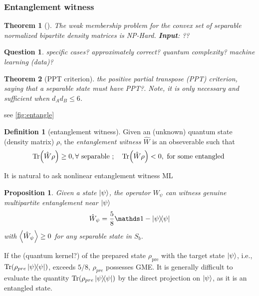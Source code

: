 \documentclass[
10pt,
aps,
pra,
linenumbers,
floatfix,
]{revtex4-2}
\theoremstyle{plain}
\newtheorem{theorem}{Theorem}
\newtheorem{proposition}{Proposition}
\newtheorem{question}{Question}
\theoremstyle{definition}
\newtheorem{definition}{Definition}
\newcommand{\ew}{\hat{W}}
\newcommand{\dm}{\rho}
\begin{document}
\subsubsection{Entanglement witness}\label{sec:entanglement_witness}
\begin{theorem}[\cite{gurvitsClassicalDeterministicComplexity2003}]
	The weak membership problem for the convex set of separable normalized bipartite density matrices is NP-Hard.
	\textbf{Input}: ??
\end{theorem}
\begin{question}
	specific cases? approximately correct? quantum complexity? machine learning (data)?
\end{question}

\begin{theorem}[PPT criterion]
	the positive partial transpose (PPT) criterion, saying that a separable state must have PPT?.
	Note, it is only necessary and sufficient when $d_A d_B \le 6$.
\end{theorem}
see \cref{fig:entangle}
\begin{definition}[entanglement witness]\label{def:entanglement_witness}
	Given an (unknown) quantum state (density matrix) $\dm$, the \emph{entanglement witness} $\ew$ is an obseverable such that
	\begin{equation}
		\Tr(\ew\dm) \ge 0 , \forall \text{ separable };\quad
		\Tr(\ew\dm) < 0 , \text{ for some entangled }
	\end{equation}
\end{definition}
It is natural to ask nonlinear entanglement witness \cite{guhneNonlinearEntanglementWitnesses2006}  
 ML
\begin{proposition}
	Given a state $\ket{\psi}$,
	the  operator $\ew_{\psi}$ can witness genuine multipartite entanglement near $\ket{\psi}$
	\begin{equation}
		\ew_{\psi} = \frac{5}{8}\identity - \op{\psi} 
	\end{equation}
	with $\expval{\ew_{\psi}}\ge 0$ for any separable state in $S_b$.
\end{proposition}
If the  (quantum kernel?) of the prepared state $\dm_{\text{pre}}$ with the target state $\ket{\psi}$, i.e., $\Tr(\dm_{pre}\op{\psi})$, exceeds $5/8$, $\dm_{pre}$ possesses GME.
It is generally difficult to evaluate the quantity $\Tr(\dm_{pre}\op{\psi})$ by the direct projection on $\ket{\psi}$, as it is an entangled state.
\end{document}
